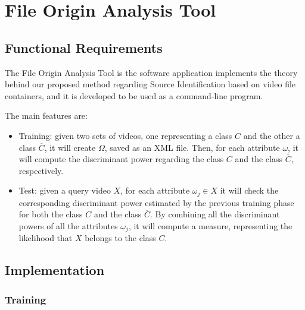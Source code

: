 \section{File Origin Analysis Tool}

\subsection{Functional Requirements}

The File Origin Analysis Tool is the software application implements the theory behind our proposed method regarding Source Identification based on video file containers, and it is developed to be used as a command-line program.

The main features are:
\begin{itemize}

\item Training: given two sets of videos, one representing a class $C$ and the other a class $\overline{C}$, it will create $\Omega$, saved as an XML file. Then, for each attribute $\omega$, it will compute the discriminant power regarding the class $C$ and the class $\overline{C}$, respectively.

\item Test: given a query video $X$, for each attribute $\omega_{j} \in X$ it will check the corresponding discriminant power estimated by the previous training phase for both the class $C$ and the class $\overline{C}$. By combining all the discriminant powers of all the attributes $\omega_{j}$, it will compute a measure, representing the likelihood that $X$ belongs to the class $C$.

\end{itemize}

\subsection{Implementation}

\subsubsection{Training}


